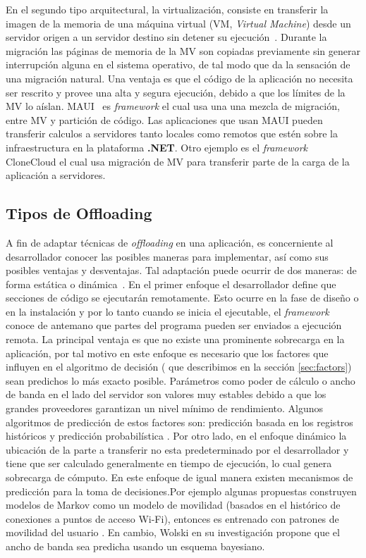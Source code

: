  En el segundo tipo arquitectural, la virtualización, consiste en transferir la imagen de la memoria 
 de una máquina virtual (VM, \textit{Virtual Machine}) desde un servidor origen a un servidor destino sin detener su ejecución~\cite{clark2005live}. Durante la migración las páginas de memoria de la MV son copiadas previamente sin generar interrupción alguna en el sistema operativo, de tal modo que da la sensación de una migración natural. Una ventaja es que el código de la aplicación no necesita ser rescrito y provee una alta y segura ejecución, debido a que los límites de la MV lo aíslan. MAUI~\cite{Cuervo:2010:MMS:1814433.1814441} es \emph{framework} el cual usa una una mezcla de migración, entre MV y partición de código. Las aplicaciones que usan MAUI pueden transferir calculos a servidores tanto locales como remotos que estén sobre la infraestructura en la plataforma {\bf .NET}. Otro ejemplo es el \emph{framework} CloneCloud \cite{chun2011clonecloud} el cual usa migración de MV para transferir parte de la carga de la aplicación a servidores.
 
\subsection{Tipos de Offloading}

A fin de adaptar técnicas de \textit{offloading} en una aplicación, es concerniente al desarrollador conocer las posibles maneras para implementar,
así como sus posibles ventajas y desventajas. Tal adaptación puede ocurrir de dos maneras: de forma estática o dinámica~\cite{murarasu2009mobile}. En el primer enfoque el desarrollador define que
 secciones de código se ejecutarán remotamente. Esto ocurre en la fase de diseño o en la instalación y por 
 lo tanto cuando se inicia el ejecutable, el \emph{framework} conoce de antemano que partes del programa pueden ser
 enviados a ejecución remota. La 
 principal ventaja es que no existe una prominente sobrecarga en la aplicación, por tal motivo en este enfoque es necesario que los factores 
 que influyen en el algoritmo de decisión ( que describimos en la sección \ref{sec:factors}) sean predichos lo más exacto posible. Parámetros como
 poder de cálculo o ancho de banda en el lado del servidor son valores muy estables debido a que los grandes proveedores garantizan un nivel mínimo de 
 rendimiento.
 Algunos algoritmos de predicción de estos factores son: predicción basada en los registros históricos \cite{gurun2004nwslite} y predicción
 probabilística \cite{rong2003extending}. 
 Por otro lado, en el enfoque dinámico la ubicación de la parte a transferir no esta predeterminado por el desarrollador y tiene que 
 ser calculado generalmente en tiempo de ejecución, lo cual genera sobrecarga de cómputo. En este enfoque de igual manera existen mecanismos 
 de predicción para la toma de decisiones.Por ejemplo algunas propuestas construyen modelos de Markov como un modelo de movilidad (basados en
 el histórico de conexiones a puntos de acceso Wi-Fi), entonces es entrenado con patrones de movilidad del usuario \cite{lee2013user}. 
 En cambio, Wolski \cite{wolski2008using} en su investigación propone que el ancho de banda sea predicha usando un esquema bayesiano.
 

